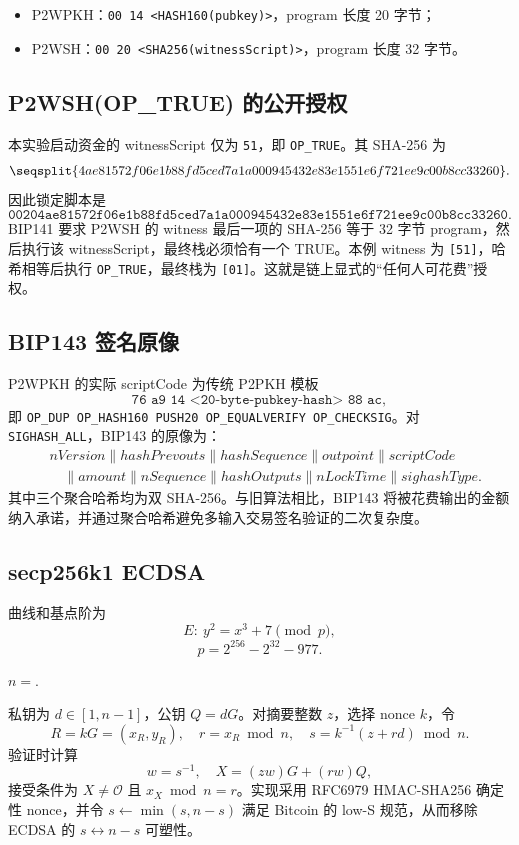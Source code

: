 \documentclass[UTF8,a4paper,zihao=-4]{ctexart}
\begin{document}
\begin{itemize}
  \item P2WPKH：\texttt{00 14 <HASH160(pubkey)>}，program 长度 20 字节；
  \item P2WSH：\texttt{00 20 <SHA256(witnessScript)>}，program 长度 32 字节。
\end{itemize}

\subsection{P2WSH(OP\_TRUE) 的公开授权}

本实验启动资金的 witnessScript 仅为 \texttt{51}，即 \texttt{OP\_TRUE}。其 SHA-256 为
\[
\seqsplit{4ae81572f06e1b88fd5ced7a1a000945432e83e1551e6f721ee9c00b8cc33260}.
\]
因此锁定脚本是
\[
\texttt{00204ae81572f06e1b88fd5ced7a1a000945432e83e1551e6f721ee9c00b8cc33260}.
\]
BIP141 要求 P2WSH 的 witness 最后一项的 SHA-256 等于 32 字节 program，然后执行该 witnessScript，最终栈必须恰有一个 TRUE\cite{bip141}。本例 witness 为 \texttt{[51]}，哈希相等后执行 \texttt{OP\_TRUE}，最终栈为 \texttt{[01]}。这就是链上显式的“任何人可花费”授权。

\subsection{BIP143 签名原像}

P2WPKH 的实际 scriptCode 为传统 P2PKH 模板
\[
\texttt{76 a9 14 <20-byte-pubkey-hash> 88 ac},
\]
即 \texttt{OP\_DUP OP\_HASH160 PUSH20 OP\_EQUALVERIFY OP\_CHECKSIG}。对 \texttt{SIGHASH\_ALL}，BIP143 的原像为\cite{bip143}：
\[
\begin{aligned}
&nVersion\|hashPrevouts\|hashSequence\|outpoint\|scriptCode\\
&\quad\|amount\|nSequence\|hashOutputs\|nLockTime\|sighashType.
\end{aligned}
\]
其中三个聚合哈希均为双 SHA-256。与旧算法相比，BIP143 将被花费输出的金额纳入承诺，并通过聚合哈希避免多输入交易签名验证的二次复杂度。

\subsection{secp256k1 ECDSA}

曲线和基点阶为
\[
E:\ y^2=x^3+7\pmod p,
\]
\[
p=2^{256}-2^{32}-977.
\]
\begin{center}
\small
$n={}$\texttt{}.
\end{center}
私钥为 $d\in[1,n-1]$，公钥 $Q=dG$。对摘要整数 $z$，选择 nonce $k$，令
\[
R=kG=(x_R,y_R),\quad r=x_R\bmod n,\quad s=k^{-1}(z+rd)\bmod n.
\]
验证时计算
\[
w=s^{-1},\quad X=(zw)G+(rw)Q,
\]
接受条件为 $X\neq\mathcal O$ 且 $x_X\bmod n=r$。实现采用 RFC6979 HMAC-SHA256 确定性 nonce，并令 $s\leftarrow\min(s,n-s)$ 满足 Bitcoin 的 low-S 规范，从而移除 ECDSA 的 $s\leftrightarrow n-s$ 可塑性。
\end{document}
